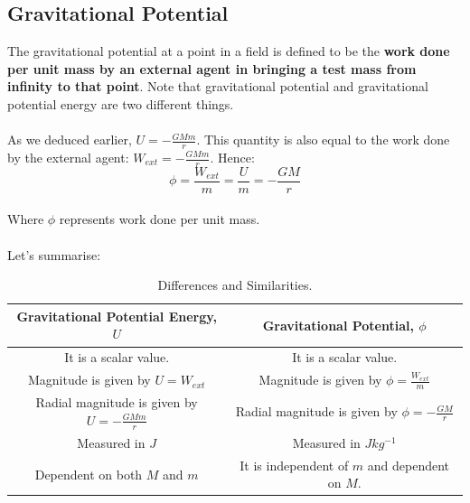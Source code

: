 \documentclass{article}
\begin{document}
\subsection{Gravitational Potential}
The gravitational potential at a point in a field is defined to be the \textbf{work done per unit mass by an external agent in bringing a test mass from infinity to that point}. Note that gravitational potential and gravitational potential energy are two different things.
\\
\\As we deduced earlier, $U=-\frac{GMm}{r}$. This quantity is also equal to the work done by the external agent: $W_{ext}=-\frac{GMm}{r}$. Hence:
\begin{equation}
   \phi =\frac{W_{ext}}{m}=\frac{U}{m}=-\frac{GM}{r}
\end{equation}
\\
Where $\phi$ represents work done per unit mass.
\\
\\Let's summarise:
\begin{table}[h!]
    \centering
    \begin{tabular}{||c c||} 
     \hline
     Gravitational Potential Energy, $U$ & Gravitational Potential, $\phi$\\ [1ex] 
     \hline 
     It is a scalar value. & It is a scalar value.\\ [1ex]
     Magnitude is given by $U=W_{ext}$ & Magnitude is given by $\phi=\frac{W_{ext}}{m}$  \\[1ex]
     Radial magnitude is given by $U=-\frac{GMm}{r}$ &  Radial magnitude is given by $\phi=-\frac{GM}{r}$\\[1ex]
     Measured in $J$ & Measured in $Jkg^{-1}$\\[1ex]
     Dependent on both $M$ and $m$ & It is independent of $m$ and dependent on $M$.\\ [1ex] 
     \hline
    \end{tabular}
    \caption{Differences and Similarities.}\label{table:1}
\end{table}
\end{document}
